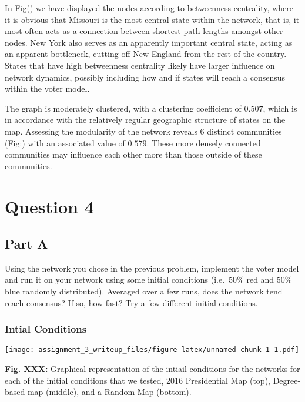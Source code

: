 \documentclass[]{article}
\begin{document}
In Fig() we have displayed the nodes according to
betweenness-centrality, where it is obvious that Missouri is the most
central state within the network, that is, it most often acts as a
connection between shortest path lengths amongst other nodes. New York
also serves as an apparently important central state, acting as an
apparent bottleneck, cutting off New England from the rest of the
country. States that have high betweenness centrality likely have larger
influence on network dynamics, possibly including how and if states will
reach a consensus within the voter model.

The graph is moderately clustered, with a clustering coefficient of
\(0.507\), which is in accordance with the relatively regular geographic
structure of states on the map. Assessing the modularity of the network
reveals 6 distinct communities (Fig:) with an associated value of
\(0.579\). These more densely connected communities may influence each
other more than those outside of these communities.

\hypertarget{question-4}{%
\section{Question 4}\label{question-4}}

\hypertarget{part-a-1}{%
\subsection{Part A}\label{part-a-1}}

Using the network you chose in the previous problem, implement the voter
model and run it on your network using some initial conditions
(i.e.~50\% red and 50\% blue randomly distributed). Averaged over a few
runs, does the network tend reach consensus? If so, how fast? Try a few
different initial conditions.

\hypertarget{intial-conditions}{%
\subsubsection{Intial Conditions}\label{intial-conditions}}

\texttt{[image: assignment\_3\_writeup\_files/figure-latex/unnamed-chunk-1-1.pdf]}

\textbf{Fig. XXX:} Graphical representation of the intiail conditions
for the networks for each of the initial conditions that we tested, 2016
Presidential Map (top), Degree-based map (middle), and a Random Map
(bottom).
\end{document}
